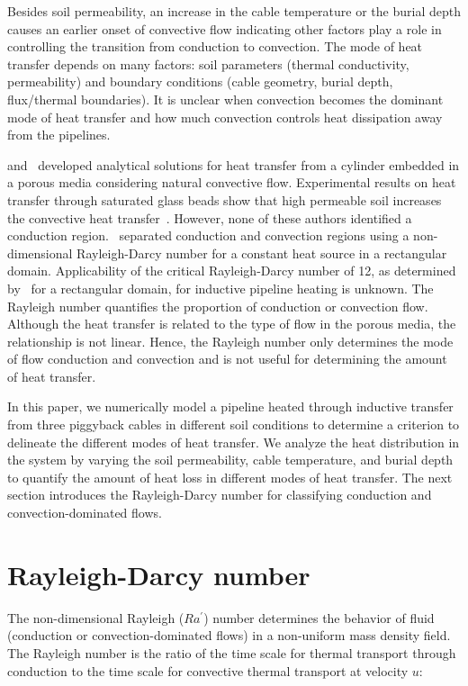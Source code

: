 \documentclass[Journal,letterpaper,InsideFigs]{ascelike-new}
\begin{document}
Besides soil permeability, an increase in the cable temperature or the burial depth causes an earlier onset of convective flow indicating other factors play a role in controlling the transition from conduction to convection. The mode of heat transfer depends on many factors: soil parameters (thermal conductivity, permeability) and boundary conditions (cable geometry, burial depth, flux/thermal boundaries). It is unclear when convection becomes the dominant mode of heat transfer and how much convection controls heat dissipation away from the pipelines. 

 and~ developed analytical solutions for heat transfer from a cylinder embedded in a porous media considering natural convective flow. Experimental results on heat transfer through saturated glass beads show that high permeable soil increases the convective heat transfer~\cite{fand1986natural}. However, none of these authors identified a conduction region.~  separated conduction and convection regions using a non-dimensional Rayleigh-Darcy number for a constant heat source in a rectangular domain. Applicability of the critical Rayleigh-Darcy number of 12, as determined by~ for a rectangular domain, for inductive pipeline heating is unknown. The Rayleigh number quantifies the proportion of conduction or convection flow. Although the heat transfer is related to the type of flow in the porous media, the relationship is not linear. Hence, the Rayleigh number only determines the mode of flow conduction and convection and is not useful for determining the amount of heat transfer.

In this paper, we numerically model a pipeline heated through inductive transfer from three piggyback cables in different soil conditions to determine a criterion to delineate the different modes of heat transfer. We analyze the heat distribution in the system by varying the soil permeability, cable temperature, and burial depth to quantify the amount of heat loss in different modes of heat transfer. The next section introduces the Rayleigh-Darcy number for classifying conduction and convection-dominated flows. 

\section{Rayleigh-Darcy number}
The non-dimensional Rayleigh ($Ra^\prime$) number determines the behavior of fluid (conduction or convection-dominated flows) in a non-uniform mass density field. The Rayleigh number is the ratio of the time scale for thermal transport through conduction to the time scale for convective thermal transport at velocity $u$:
\end{document}
